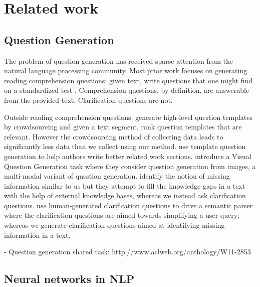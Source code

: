 \documentclass[11pt]{report}
\begin{document}

\newpage

\chapter{Related work}

\section{Question Generation}

The problem of question generation has received sparse attention from the natural language processing community. Most prior work focuses on generating reading comprehension questions:  given text, write questions that one might find on a standardized test \cite{vanderwende2008importance,heilman2011automatic,rus2011question,olney2012question}.  Comprehension questions, by definition, are answerable from the provided text. Clarification questions are not.  

Outside reading comprehension questions, \cite{labutov2015deep} generate high-level question templates by crowdsourcing and given a text segment, rank question templates that are relevant. However the crowdsourcing method of collecting data leads to significantly less data than we collect using our method. \cite{liu2010automatic} use template question generation to help authors write better related work sections. \cite{mostafazadeh2016generating} introduce a Visual Question Generation task where they consider question generation from images, a multi-modal variant of question generation. 
\cite{penas2010filling} identify the notion of missing information similar to us but they attempt to fill the knowledge gaps in a text with the help of external knowledge bases, whereas we instead ask clarification questions. \cite{artzi2011bootstrapping} use human-generated clarification questions to drive a semantic parser where the clarification questions are aimed towards simplifying a user query; whereas we generate clarification questions aimed at  identifying missing information in a text. 

- Question generation shared task: http://www.aclweb.org/anthology/W11-2853

\section{Neural networks in NLP}
\end{document}
